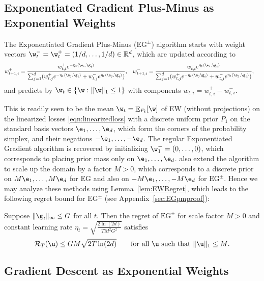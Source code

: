 \documentclass{colt2018} %
\DeclareMathOperator*{\E}{\mathbb{E}}
\newcommand{\reals}{\mathbb{R}}
\newcommand{\regret}{\mathcal{R}}
\begin{document}
\subsection{Exponentiated Gradient Plus-Minus as Exponential Weights}\label{sec:EG}

The Exponentiated Gradient Plus-Minus ($\text{EG}^\pm$) algorithm
\citep{KivinenWarmuth} starts with weight vectors $\w_t^- = \w_t^+ =
(1/d,\ldots,1/d) \in \reals^d$, which are updated according to
% 
\begin{align*}
  w_{t+1,i}^+ &= \frac{w_{t,i}^+ e^{-\eta_t \langle \e_i, \g_{t} \rangle}}
    {\sum_{j=1}^d (w_{t,j}^+ e^{-\eta_t \langle \e_j, \g_{t} \rangle} + w_{t,j}^- e^{\eta_t
    \langle \e_j, \g_{t} \rangle})},
  &
  w_{t+1,i}^- &= \frac{w_{t,i}^- e^{\eta_t \langle \e_i, \g_{t} \rangle}}
    {\sum_{j=1}^d (w_{t,j}^+ e^{-\eta_t \langle \e_j \g_{t} \rangle} + w_{t,j}^- e^{\eta_t
    \langle \e_j, \g_{t} \rangle})},
\end{align*}
% 
and predicts by $\w_t \in \{\w: \|\w\|_1 \leq 1\}$ with components
% 
% 
  $w_{t,i} = w_{t,i}^+ - w_{t,i}^-$.
% 
% 

This is readily seen to be the mean $\w_t = \E_{P_t}[\w]$ %
of EW
(without projections) on the linearized losses
\eqref{eqn:linearizedloss} with a discrete uniform
prior $P_1$ on the standard basis vectors $\e_1,\ldots,\e_d$, which form
the corners of the probability simplex, and their negations
$-\e_1,\ldots,-\e_d$. The regular Exponentiated Gradient algorithm is
recovered by initializing $\w_1^- = (0,\ldots,0)$, which corresponds to
placing prior mass only on $\e_1,\ldots,\e_d$. 
also extend the algorithm to scale up the domain by a factor $M > 0$,
which corresponds to a discrete prior on $M\e_1,\ldots,M\e_d$ for EG and
also on $-M\e_1,\ldots,-M\e_d$ for $\text{EG}^\pm$. Hence we may analyze
these methods using Lemma~\ref{lem:EWRegret}, which leads to the
following regret bound for $\text{EG}^\pm$ (see
Appendix~\ref{sec:EGpmproof}):
% 
\begin{theorem}[$\text{EG}^\pm$ as EW]\label{th:EGpm} Suppose $\|\g_t\|_\infty \leq G$ for
all $t$. Then the regret of $\text{EG}^\pm$ for scale factor $M > 0$ and
constant learning rate $\eta_t = \sqrt{\frac{2 \ln(2d)}{TM^2G^2}}$
satisfies
% 
\[
  \regret_T(\u)
    \leq GM\sqrt{2 T\ln(2d)}
    \qquad \text{for all $\u$ such that $\|\u\|_1 \leq M$.}
\]
\end{theorem}


\subsection{Gradient Descent as Exponential Weights}
\label{sec:GD}
\end{document}
